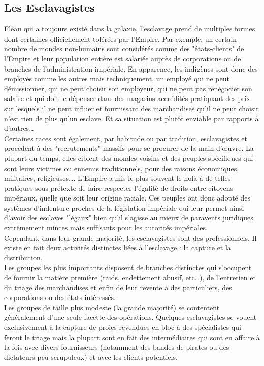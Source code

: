 \documentclass[twoside]{article}
\begin{document}
\subsection{Les Esclavagistes}
Fléau qui a toujours existé dans la galaxie, l'esclavage prend de multiples formes dont certaines officiellement tolérées par l'Empire. Par exemple, un certain nombre de mondes non-humains sont considérés comme des "états-clients" de l'Empire et leur population entière est salariée auprès de corporations ou de branches de l'administration impériale. En apparence, les indigènes sont donc des employés comme les autres mais techniquement, un employé qui ne peut démissionner, qui ne peut choisir son employeur, qui ne peut pas renégocier son salaire et qui doit le dépenser dans des magasins accrédités pratiquant des prix sur lesquels il ne peut influer et fournissant des marchandises qu'il ne peut choisir n'est rien de plus qu'un esclave. Et sa situation est plutôt enviable par rapports à d'autres\ldots\\

Certaines races sont également, par habitude ou par tradition, esclavagistes et procèdent à des "recrutements" massifs pour se procurer de la main d'œuvre. La plupart du temps, elles ciblent des mondes voisins et des peuples spécifiques qui sont leurs victimes ou ennemis traditionnels, pour des raisons économiques, militaires, religieuses\ldots. L'Empire a mis le plus souvent le holà à de telles pratiques sous prétexte de faire respecter l'égalité de droits entre citoyens impériaux, quelle que soit leur origine raciale. Ces peuples ont donc adopté des systèmes d'indenture proches de la législation impériale qui leur permet ainsi d'avoir des esclaves "légaux" bien qu'il s'agisse au mieux de paravents juridiques extrêmement minces mais suffisants pour les autorités impériales.\\

Cependant, dans leur grande majorité, les esclavagistes sont des professionnels. Il existe en fait deux activités distinctes liées à l'esclavage : la capture et la distribution.\\

Les groupes les plus importants disposent de branches distinctes qui s'occupent de fournir la matière première (raids, endettement abusif, etc\ldots), de l'entretien et du triage des marchandises et enfin de leur revente à des particuliers, des corporations ou des états intéressés.\\

Les groupes de taille plus modeste (la grande majorité) se contentent généralement d'une seule facette des opérations. Quelques esclavagistes se vouent exclusivement à la capture de proies revendues en bloc à des spécialistes qui feront le triage mais la plupart sont en fait des intermédiaires qui sont en affaire à la fois avec divers fournisseurs (notamment des bandes de pirates ou des dictateurs peu scrupuleux) et avec les clients potentiels.\\
\end{document}
